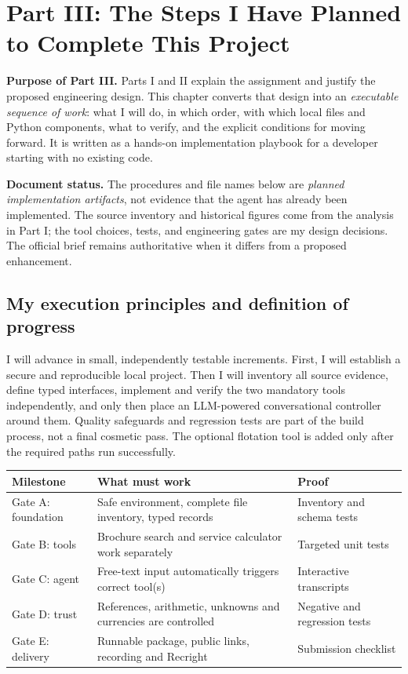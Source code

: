 \documentclass[11pt,a4paper]{article}
\begin{document}
\clearpage
\section[Part III: The Steps I Have Planned to Complete This Project]{Part III: The Steps I Have Planned\\to Complete This Project}
\begin{keybox}
\textbf{Purpose of Part III.} Parts I and II explain the assignment and justify the proposed engineering design. This chapter converts that design into an \emph{executable sequence of work}: what I will do, in which order, with which local files and Python components, what to verify, and the explicit conditions for moving forward. It is written as a hands-on implementation playbook for a developer starting with no existing code.
\end{keybox}
\textbf{Document status.} The procedures and file names below are \emph{planned implementation artifacts}, not evidence that the agent has already been implemented. The source inventory and historical figures come from the analysis in Part I; the tool choices, tests, and engineering gates are my design decisions. The official brief remains authoritative when it differs from a proposed enhancement.

\subsection{My execution principles and definition of progress}
I will advance in small, independently testable increments. First, I will establish a secure and reproducible local project. Then I will inventory all source evidence, define typed interfaces, implement and verify the two mandatory tools independently, and only then place an LLM-powered conversational controller around them. Quality safeguards and regression tests are part of the build process, not a final cosmetic pass. The optional flotation tool is added only after the required paths run successfully.

\begin{tabularx}{\textwidth}{@{}L{27mm}Y L{33mm}@{}}
\toprule\textbf{Milestone} & \textbf{What must work} & \textbf{Proof}\\\midrule
Gate A: foundation & Safe environment, complete file inventory, typed records & Inventory and schema tests\\
Gate B: tools & Brochure search and service calculator work separately & Targeted unit tests\\
Gate C: agent & Free-text input automatically triggers correct tool(s) & Interactive transcripts\\
Gate D: trust & References, arithmetic, unknowns and currencies are controlled & Negative and regression tests\\
Gate E: delivery & Runnable package, public links, recording and Recright & Submission checklist\\
\bottomrule
\end{tabularx}
\end{document}
